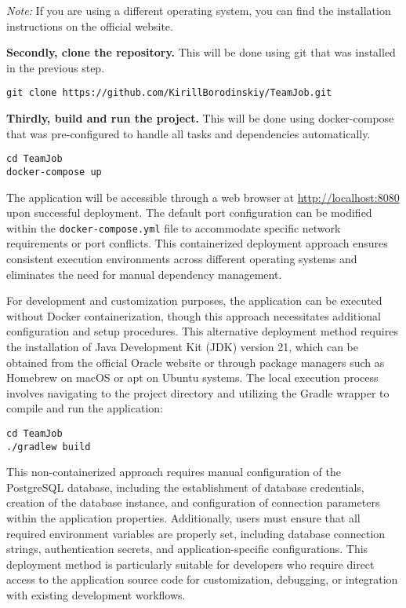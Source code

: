 \textit{Note:} If you are using a different operating system, you can find the installation instructions on the official website.

\textbf{Secondly, clone the repository.} This will be done using git that was installed in the previous step.
\begin{verbatim}
git clone https://github.com/KirillBorodinskiy/TeamJob.git
\end{verbatim}

\textbf{Thirdly, build and run the project.} This will be done using docker-compose that was pre-configured to handle all tasks and dependencies automatically.
\begin{verbatim}
cd TeamJob
docker-compose up
\end{verbatim}

The application will be accessible through a web browser at \url{http://localhost:8080} upon successful deployment.
The default port configuration can be modified within the \texttt{docker-compose.yml} file to accommodate specific network requirements or port conflicts.
This containerized deployment approach ensures consistent execution environments across different operating systems and eliminates the need for manual dependency management.

For development and customization purposes, the application can be executed without Docker containerization, though this approach necessitates additional configuration and setup procedures.
This alternative deployment method requires the installation of Java Development Kit (JDK) version 21, which can be obtained from the official Oracle website or through package managers such as Homebrew on macOS or apt on Ubuntu systems.
The local execution process involves navigating to the project directory and utilizing the Gradle wrapper to compile and run the application:

\begin{verbatim}
cd TeamJob
./gradlew build
\end{verbatim}

This non-containerized approach requires manual configuration of the PostgreSQL database, including the establishment of database credentials, creation of the database instance, and configuration of connection parameters within the application properties.
Additionally, users must ensure that all required environment variables are properly set, including database connection strings, authentication secrets, and application-specific configurations.
This deployment method is particularly suitable for developers who require direct access to the application source code for customization, debugging, or integration with existing development workflows.

